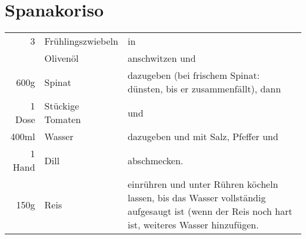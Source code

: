 \section{Spanakoriso}
\begin{longtable}{rlL{16.1cm}}
	3		&	Frühlingszwiebeln	&	in \\
			&	Olivenöl			&	anschwitzen und \\
	600g	&	Spinat				&	dazugeben (bei frischem Spinat: dünsten, bis er zusammenfällt), dann \\
	1 Dose	&	Stückige Tomaten	&	und \\
	400ml	&	Wasser				&	dazugeben und mit Salz, Pfeffer und \\
	1 Hand	&	Dill				&	abschmecken.\\
	150g	&	Reis				&	einrühren und unter Rühren köcheln lassen, bis das Wasser vollständig aufgesaugt ist
										(wenn der Reis noch hart ist, weiteres Wasser hinzufügen.
\end{longtable}